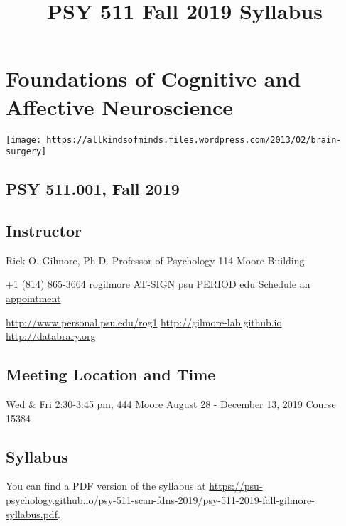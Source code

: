 \documentclass[]{article}
\title{PSY 511 Fall 2019 Syllabus}
\author{}
\date{}
\begin{document}
\maketitle

\hypertarget{foundations-of-cognitive-and-affective-neuroscience}{%
\section{Foundations of Cognitive and Affective
Neuroscience}\label{foundations-of-cognitive-and-affective-neuroscience}}

\texttt{[image: https://allkindsofminds.files.wordpress.com/2013/02/brain-surgery]}

\hypertarget{psy-511.001-fall-2019}{%
\subsection{PSY 511.001, Fall 2019}\label{psy-511.001-fall-2019}}

\hypertarget{instructor}{%
\subsection{Instructor}\label{instructor}}

Rick O. Gilmore, Ph.D. Professor of Psychology 114 Moore Building

+1 (814) 865-3664 rogilmore AT-SIGN psu PERIOD edu
\href{http://doodle.com/rickgilmore}{Schedule an appointment}

\url{http://www.personal.psu.edu/rog1}
\url{http://gilmore-lab.github.io} \url{http://databrary.org}

\hypertarget{meeting-location-and-time}{%
\subsection{Meeting Location and Time}\label{meeting-location-and-time}}

Wed \& Fri 2:30-3:45 pm, 444 Moore August 28 - December 13, 2019 Course
15384

\hypertarget{syllabus}{%
\subsection{Syllabus}\label{syllabus}}

You can find a PDF version of the syllabus at
\url{https://psu-psychology.github.io/psy-511-scan-fdns-2019/psy-511-2019-fall-gilmore-syllabus.pdf}.
\end{document}
